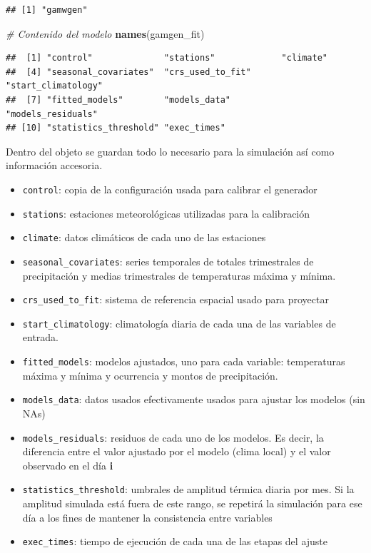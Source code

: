 \documentclass[
]{article}
\newenvironment{Shaded}{}{}
\newcommand{\CommentTok}[1]{\textcolor[rgb]{0.38,0.63,0.69}{\textit{#1}}}
\newcommand{\KeywordTok}[1]{\textcolor[rgb]{0.00,0.44,0.13}{\textbf{#1}}}
\newcommand{\NormalTok}[1]{#1}
\providecommand{\tightlist}{%
  \setlength{\itemsep}{0pt}\setlength{\parskip}{0pt}}
\begin{document}
\begin{verbatim}
## [1] "gamwgen"
\end{verbatim}

\begin{Shaded}
\begin{Highlighting}[]
\CommentTok{# Contenido del modelo }
\KeywordTok{names}\NormalTok{(gamgen_fit)}
\end{Highlighting}
\end{Shaded}

\begin{verbatim}
##  [1] "control"              "stations"             "climate"             
##  [4] "seasonal_covariates"  "crs_used_to_fit"      "start_climatology"   
##  [7] "fitted_models"        "models_data"          "models_residuals"    
## [10] "statistics_threshold" "exec_times"
\end{verbatim}

Dentro del objeto se guardan todo lo necesario para la simulación así como información accesoria.

\begin{itemize}
\tightlist
\item
  \texttt{control}: copia de la configuración usada para calibrar el generador
\item
  \texttt{stations}: estaciones meteorológicas utilizadas para la calibración
\item
  \texttt{climate}: datos climáticos de cada uno de las estaciones
\item
  \texttt{seasonal\_covariates}: series temporales de totales trimestrales de precipitación y medias trimestrales de temperaturas máxima y mínima.
\item
  \texttt{crs\_used\_to\_fit}: sistema de referencia espacial usado para proyectar
\item
  \texttt{start\_climatology}: climatología diaria de cada una de las variables de entrada.
\item
  \texttt{fitted\_models}: modelos ajustados, uno para cada variable: temperaturas máxima y mínima y ocurrencia y montos de precipitación.
\item
  \texttt{models\_data}: datos usados efectivamente usados para ajustar los modelos (sin NAs)
\item
  \texttt{models\_residuals}: residuos de cada uno de los modelos. Es decir, la diferencia entre el valor ajustado por el modelo (clima local) y el valor observado en el día \textbf{i}
\item
  \texttt{statistics\_threshold}: umbrales de amplitud térmica diaria por mes. Si la amplitud simulada está fuera de este rango, se repetirá la simulación para ese día a los fines de mantener la consistencia entre variables
\item
  \texttt{exec\_times}: tiempo de ejecución de cada una de las etapas del ajuste
\end{itemize}
\end{document}
